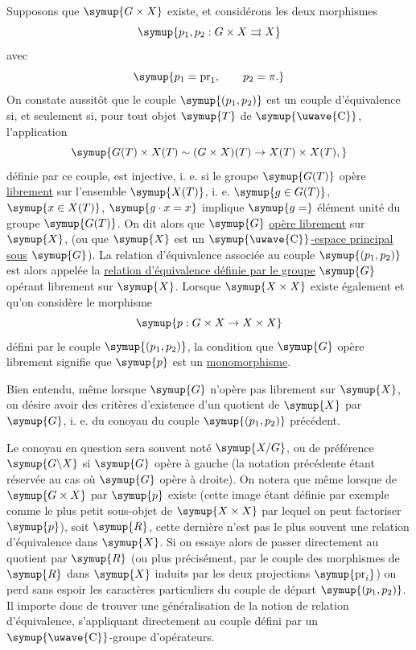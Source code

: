 Supposons que $\symup{G\times X}$ existe, et considérons les deux morphismes
\[
  \symup{p_1,p_2:G\times X\rightrightarrows X}
\]
avec
\[
  \symup{p_1=\operatorname{pr}_1,\qquad p_2=\pi.}
\]
On constate aussitôt que le couple $\symup{(p_1,p_2)}$ est un couple d'équivalence si,
et seulement si, pour tout objet $\symup{T}$ de $\symup{\text{\uwave{C}}}$, l'application
\[
  \symup{G(T)\times X(T)\sim(G\times X)(T)
  \to X(T)\times X(T),}
\]
définie par ce couple, est injective, i. e. si le groupe $\symup{G(T)}$ opère
\uline{librement} sur l'ensemble $\symup{X(T)}$, i. e. $\symup{g\in G(T)}$, $\symup{x\in X(T)}$,
$\symup{g\cdot x=x}$ implique $\symup{g=}$ élément unité du groupe $\symup{G(T)}$. On dit
alors que $\symup{G}$ \uline{opère librement} sur $\symup{X}$, (ou que $\symup{X}$ est un
$\symup{\text{\uwave{C}}}$\uline{-espace principal sous} $\symup{G}$). La relation d'équivalence
associée au couple $\symup{(p_1,p_2)}$ est alors appelée la \uline{relation
d'équivalence définie par le groupe} $\symup{G}$ opérant librement sur $\symup{X}$. Lorsque
$\symup{X\times X}$ existe également et qu'on considère le morphisme
\[
  \symup{p:G\times X\to X\times X}
\]
défini par le couple $\symup{(p_1,p_2)}$, la condition que $\symup{G}$ opère librement signifie
que $\symup{p}$ est un \uline{monomorphisme}.

Bien entendu, même lorsque $\symup{G}$ n'opère pas librement sur $\symup{X}$, on désire avoir
des critères d'existence d'un quotient de $\symup{X}$ par $\symup{G}$, i. e. du conoyau du
couple $\symup{(p_1,p_2)}$ précédent.

Le conoyau en question sera souvent noté $\symup{X/G}$, ou de préférence $\symup{G\backslash
X}$ si $\symup{G}$ opère à gauche (la notation précédente étant réservée au cas où $\symup{G}$
opère à droite). On notera que même lorsque  de $\symup{G\times X}$ par $\symup{p}$
existe (cette image étant définie par exemple comme le plus petit sous-objet de
$\symup{X\times X}$ par lequel on peut factoriser $\symup{p}$), soit $\symup{R}$, cette dernière n'est
pas le plus souvent une relation d'équivalence dans $\symup{X}$. Si on essaye alors de
passer directement au quotient par $\symup{R}$ (ou plus précisément, par le couple des
morphismes de $\symup{R}$ dans $\symup{X}$ induits par les deux projections
$\symup{\operatorname{pr}_i}$) on perd sans espoir les caractères particuliers du
couple de départ $\symup{(p_1,p_2)}$. Il importe donc de trouver une généralisation de
la notion de relation d'équivalence, s'appliquant directement au couple défini
par un $\symup{\text{\uwave{C}}}$-groupe d'opérateurs.

